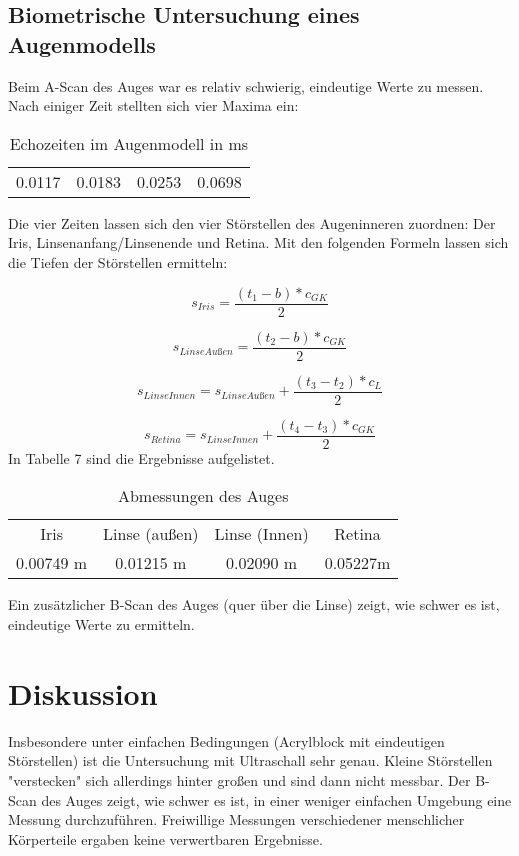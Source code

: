 \documentclass[11pt,ngerman,a4paper]{article}
\begin{document}
\subsection{Biometrische Untersuchung eines Augenmodells}
Beim A-Scan des Auges war es relativ schwierig, eindeutige Werte zu messen. Nach einiger Zeit stellten sich vier Maxima ein:
\begin{table}[h]
\centering
 \begin{tabular}{|c|c|c|c|}
 0.0117 & 0.0183 & 0.0253 & 0.0698 \\
 \end{tabular}
\caption{Echozeiten im Augenmodell in ms}
\end{table}
\newline
Die vier Zeiten lassen sich den vier Störstellen des Augeninneren zuordnen: Der Iris, Linsenanfang/Linsenende und Retina. 
Mit den folgenden Formeln lassen sich die Tiefen der Störstellen ermitteln:

\begin{equation}
s_{Iris}=\frac{(t_1-b)*c_{GK}}{2}
\end{equation}

\begin{equation}
s_{LinseAußen}=\frac{(t_2-b)*c_{GK}}{2}
\end{equation}

\begin{equation}
s_{LinseInnen}=s_{LinseAußen}+\frac{(t_3-t_2)*c_L}{2}
\end{equation}

\begin{equation}
s_{Retina}=s_{LinseInnen}+\frac{(t_4-t_3)*c_{GK}}{2}
\end{equation}
\newline
In Tabelle 7 sind die Ergebnisse aufgelistet.
\begin{table}[h]
\centering
 \begin{tabular}{|c|c|c|c|}
 Iris & Linse (außen) & Linse (Innen) & Retina \\
0.00749 m & 0.01215 m & 0.02090 m & 0.05227m \\
 \end{tabular}
\label{7}
\caption{Abmessungen des Auges}
\end{table}
\newline
Ein zusätzlicher B-Scan des Auges (quer über die Linse) zeigt, wie schwer es ist, eindeutige Werte zu ermitteln.

\section{Diskussion}
Insbesondere unter einfachen Bedingungen (Acrylblock mit eindeutigen Störstellen) ist die Untersuchung mit Ultraschall sehr genau. Kleine Störstellen "verstecken" sich allerdings hinter großen und sind dann nicht messbar. Der B-Scan des Auges zeigt, wie schwer es ist, in einer weniger einfachen Umgebung eine Messung durchzuführen. Freiwillige Messungen verschiedener menschlicher Körperteile ergaben keine verwertbaren Ergebnisse.
\end{document}
